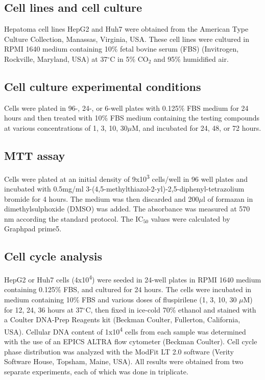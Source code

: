 \documentclass[10pt]{article}
\begin{document}
\subsection*{Cell lines and cell culture}

Hepatoma cell lines HepG2 and Huh7 were obtained from the American Type Culture Collection, Manassas, Virginia, USA. These cell lines were cultured in RPMI 1640 medium containing 10\% fetal bovine serum (FBS) (Invitrogen, Rockville, Maryland, USA) at 37$^\circ$C in 5\% CO$_2$ and 95\% humidified air.

\subsection*{Cell culture experimental conditions}

Cells were plated in 96-, 24-, or 6-well plates with 0.125\% FBS medium for 24 hours and then treated with 10\% FBS medium containing the testing compounds at various concentrations of 1, 3, 10, 30$\mu$M, and incubated for 24, 48, or 72 hours.

\subsection*{MTT assay}

Cells were plated at an initial density of 9x10\textsuperscript{3} cells/well in 96 well plates and incubated with 0.5mg/ml 3-(4,5-methylthiazol-2-yl)-2,5-diphenyl-tetrazolium bromide for 4 hours. The medium was then discarded and 200$\mu$l of formazan in dimethylsulphoxide (DMSO) was added. The absorbance was measured at 570 nm according the standard protocol. The IC$_{50}$ values were calculated by Graphpad prime5.

\subsection*{Cell cycle analysis}

HepG2 or Huh7 cells (4x10\textsuperscript{4}) were seeded in 24-well plates in RPMI 1640 medium containing 0.125\% FBS, and cultured for 24 hours. The cells were incubated in medium containing 10\% FBS and various doses of fluspirilene (1, 3, 10, 30 $\mu$M) for 12, 24, 36 hours at 37$^\circ$C, then fixed in ice-cold 70\% ethanol and stained with a Coulter DNA-Prep Reagents kit (Beckman Coulter, Fullerton, California, USA). Cellular DNA content of 1x10\textsuperscript{4} cells from each sample was determined with the use of an EPICS ALTRA flow cytometer (Beckman Coulter). Cell cycle phase distribution was analyzed with the ModFit LT 2.0 software (Verity Software House, Topsham, Maine, USA). All results were obtained from two separate experiments, each of which was done in triplicate.
\end{document}
